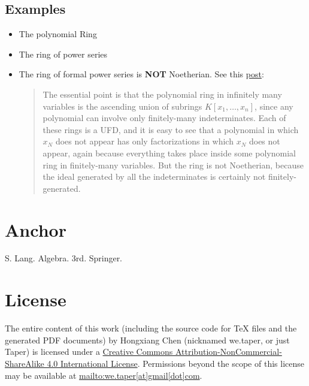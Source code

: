 \documentclass{article}
\begin{document}
    \subsection{Examples}
    \label{sec:Examples}
    \begin{itemize}
        \item The polynomial Ring
        \item The ring of power series
        \item The ring of formal power series is \textbf{NOT} Noetherian.
            See this
            \href{http://math.stackexchange.com/questions/281597/an-example-of-a-non-noetherian-ufd}{post}:
            \begin{quote}
            The essential point is that the polynomial ring in
            infinitely many variables is the ascending union of
            subrings $K[x_1,\ldots,x_n]$, since any polynomial can
            involve only finitely-many indeterminates. Each of these
            rings is a UFD, and it is easy to see that a polynomial in
            which $x_N$ does not appear has only factorizations in
            which $x_N$ does not appear, again because everything
            takes place inside some polynomial ring in finitely-many
            variables. But the ring is not Noetherian, because the
            ideal generated by all the indeterminates is certainly not
            finitely-generated.
            \end{quote}
    \end{itemize}
\section{Anchor}
\printnomenclature
\begin{thebibliography}{1}
     S. Lang. Algebra. 3rd. Springer.
\end{thebibliography}
\section{License}
The entire content of this work (including the source code
for TeX files and the generated PDF documents) by 
Hongxiang Chen (nicknamed we.taper, or just Taper) is
licensed under a 
\href{http://creativecommons.org/licenses/by-nc-sa/4.0/}{Creative 
Commons Attribution-NonCommercial-ShareAlike 4.0 International 
License}. Permissions beyond the scope of this 
license may be available at \url{mailto:we.taper[at]gmail[dot]com}.
\end{document}
